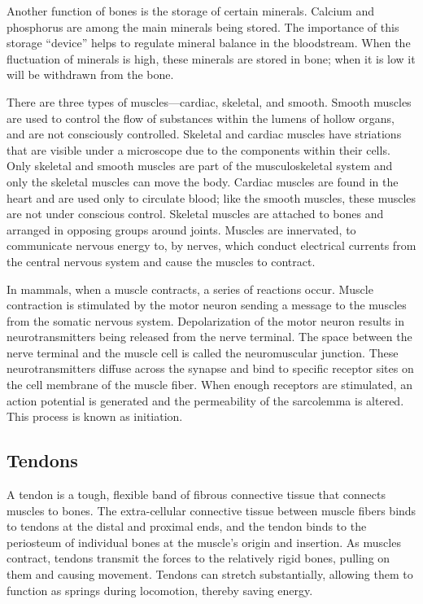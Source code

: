 Another function of bones is the storage of certain minerals. Calcium and phosphorus are among the main minerals being stored. The importance of this storage ``device'' helps to regulate mineral balance in the bloodstream. When the fluctuation of minerals is high, these minerals are stored in bone; when it is low it will be withdrawn from the bone.

There are three types of muscles---cardiac, skeletal, and smooth. Smooth muscles are used to control the flow of substances within the lumens of hollow organs, and are not consciously controlled. Skeletal and cardiac muscles have striations that are visible under a microscope due to the components within their cells. Only skeletal and smooth muscles are part of the musculoskeletal system and only the skeletal muscles can move the body. Cardiac muscles are found in the heart and are used only to circulate blood; like the smooth muscles, these muscles are not under conscious control. Skeletal muscles are attached to bones and arranged in opposing groups around joints. Muscles are innervated, to communicate nervous energy to, by nerves, which conduct electrical currents from the central nervous system and cause the muscles to contract.

In mammals, when a muscle contracts, a series of reactions occur. Muscle contraction is stimulated by the motor neuron sending a message to the muscles from the somatic nervous system. Depolarization of the motor neuron results in neurotransmitters being released from the nerve terminal. The space between the nerve terminal and the muscle cell is called the neuromuscular junction. These neurotransmitters diffuse across the synapse and bind to specific receptor sites on the cell membrane of the muscle fiber. When enough receptors are stimulated, an action potential is generated and the permeability of the sarcolemma is altered. This process is known as initiation.

\hypertarget{tendons}{%
\subsection{Tendons}\label{tendons}}

A tendon is a tough, flexible band of fibrous connective tissue that connects muscles to bones. The extra-cellular connective tissue between muscle fibers binds to tendons at the distal and proximal ends, and the tendon binds to the periosteum of individual bones at the muscle's origin and insertion. As muscles contract, tendons transmit the forces to the relatively rigid bones, pulling on them and causing movement. Tendons can stretch substantially, allowing them to function as springs during locomotion, thereby saving energy.

